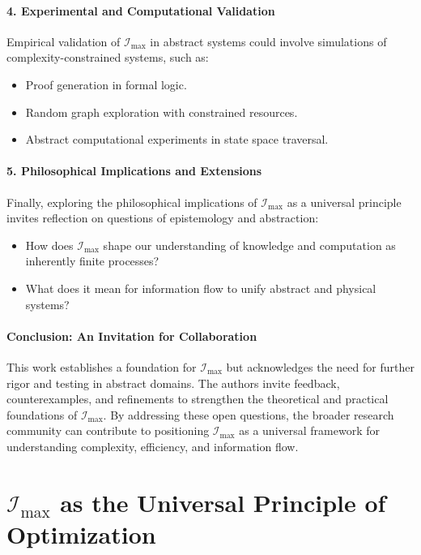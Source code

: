 \documentclass[12pt]{article}
\begin{document}
\paragraph{4. Experimental and Computational Validation}
Empirical validation of \(\mathcal{I}_{\text{max}}\) in abstract systems could involve simulations of complexity-constrained systems, such as:
\begin{itemize}
    \item Proof generation in formal logic.
    \item Random graph exploration with constrained resources.
    \item Abstract computational experiments in state space traversal.
\end{itemize}

\paragraph{5. Philosophical Implications and Extensions}
Finally, exploring the philosophical implications of \(\mathcal{I}_{\text{max}}\) as a universal principle invites reflection on questions of epistemology and abstraction:
\begin{itemize}
    \item How does \(\mathcal{I}_{\text{max}}\) shape our understanding of knowledge and computation as inherently finite processes?
    \item What does it mean for information flow to unify abstract and physical systems?
\end{itemize}

\paragraph{Conclusion: An Invitation for Collaboration}
This work establishes a foundation for \(\mathcal{I}_{\text{max}}\) but acknowledges the need for further rigor and testing in abstract domains. The authors invite feedback, counterexamples, and refinements to strengthen the theoretical and practical foundations of \(\mathcal{I}_{\text{max}}\). By addressing these open questions, the broader research community can contribute to positioning \(\mathcal{I}_{\text{max}}\) as a universal framework for understanding complexity, efficiency, and information flow.


\section{\(\mathcal{I}_{\text{max}}\) as the Universal Principle of Optimization}
\end{document}
